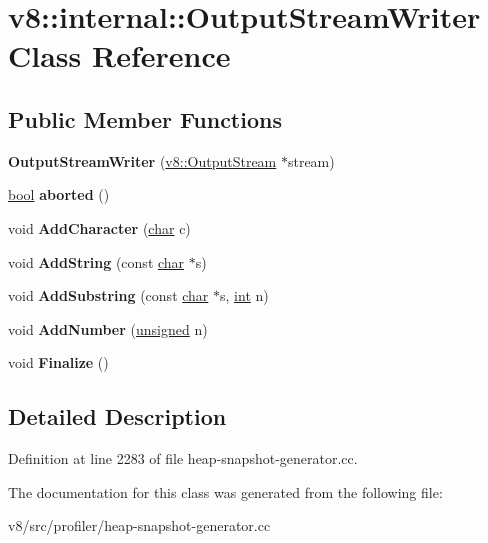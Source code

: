 \hypertarget{classv8_1_1internal_1_1OutputStreamWriter}{}\section{v8\+:\+:internal\+:\+:Output\+Stream\+Writer Class Reference}
\label{classv8_1_1internal_1_1OutputStreamWriter}
\subsection*{Public Member Functions}
\begin{DoxyCompactItemize}
\item 
\mbox{\label{classv8_1_1internal_1_1OutputStreamWriter_af20c1920eef3070065347358f0a52bfb}} 
{\bfseries Output\+Stream\+Writer} (\mbox{\hyperlink{classv8_1_1OutputStream}{v8\+::\+Output\+Stream}} $\ast$stream)
\item 
\mbox{\label{classv8_1_1internal_1_1OutputStreamWriter_a786eee01911e2c412d67422a8fe86265}} 
\mbox{\hyperlink{classbool}{bool}} {\bfseries aborted} ()
\item 
\mbox{\label{classv8_1_1internal_1_1OutputStreamWriter_abe84a4a8672b458c1eda763295bba60e}} 
void {\bfseries Add\+Character} (\mbox{\hyperlink{classchar}{char}} c)
\item 
\mbox{\label{classv8_1_1internal_1_1OutputStreamWriter_a2b4529a2584f920315a66814489eb214}} 
void {\bfseries Add\+String} (const \mbox{\hyperlink{classchar}{char}} $\ast$s)
\item 
\mbox{\label{classv8_1_1internal_1_1OutputStreamWriter_a2626cd836862fffbbfac9f9e3542a357}} 
void {\bfseries Add\+Substring} (const \mbox{\hyperlink{classchar}{char}} $\ast$s, \mbox{\hyperlink{classint}{int}} n)
\item 
\mbox{\label{classv8_1_1internal_1_1OutputStreamWriter_a35497ea28ddc99160026a0c28d49e160}} 
void {\bfseries Add\+Number} (\mbox{\hyperlink{classunsigned}{unsigned}} n)
\item 
\mbox{\label{classv8_1_1internal_1_1OutputStreamWriter_af1025ba7918a92345913bec1ba5a0bce}} 
void {\bfseries Finalize} ()
\end{DoxyCompactItemize}


\subsection{Detailed Description}


Definition at line 2283 of file heap-\/snapshot-\/generator.\+cc.



The documentation for this class was generated from the following file\+:\begin{DoxyCompactItemize}
\item 
v8/src/profiler/heap-\/snapshot-\/generator.\+cc\end{DoxyCompactItemize}
